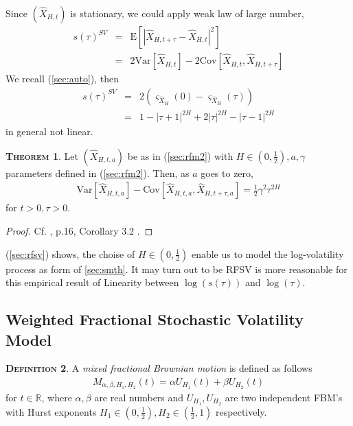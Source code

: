 \documentclass[a4paper, twoside, 11pt]{article}
\theoremstyle{definition}
\newtheorem{definition}{\scshape Definition}[section]
\newtheorem{theorem}[definition]{\scshape Theorem}
\begin{document}
Since $(\hat{X}_{H,t})$ is stationary, we could apply weak law of large number,
\begin{eqnarray}
  s(\tau)^{SV} &=& \mathrm{E}[|\hat{X}_{H,t+\tau}-\hat{X}_{H,t}|^2]\nonumber\\
  &=& 2 \mathrm{Var}[\hat{X}_{H,t}] - 2 \mathrm{Cov}[\hat{X}_{H,t}, \hat{X}_{H,t+\tau}]\nonumber
  \label{sec:smtsv}
\end{eqnarray}
We recall (\ref{sec:auto}), then
\begin{eqnarray}
  s(\tau)^{SV} &=& 2 (\varsigma_{\hat{X}_H}(0) - \varsigma_{\hat{X}_H}(\tau))\nonumber\\
  &=& 1 - |\tau+1|^{2H} + 2|\tau|^{2H} - |\tau-1|^{2H}
  \label{sec:smtsv2}
\end{eqnarray}
in general not linear.

\begin{theorem}
  Let $(\hat{X}_{H, t, a})$ be as in (\ref{sec:rfm2}) with $H\in(0, \frac{1}{2}), a, \gamma$  parameters defined in (\ref{sec:rfm2}). Then, as $a$ goes to zero,
  \begin{eqnarray}
	\mathrm{Var}[\hat{X}_{H,t, a}] - \mathrm{Cov}[\hat{X}_{H,t, a}, \hat{X}_{H,t+\tau, a}] = \frac{1}{2} \gamma^2\tau^{2H}
	\label{sec:rfsv}
  \end{eqnarray}
  for $t>0, \tau>0$.
\end{theorem}
\begin{proof}
  Cf. \cite{gradin}, p.16, Corollary 3.2 .
\end{proof}

(\ref{sec:rfsv}) shows, the choise of $H\in(0,\frac{1}{2})$ enable us to model the log-volatility process as form of \ref{sec:smth}. It may turn out to be RFSV is more reasonable for this empirical result of Linearity between $\log(s(\tau))$ and $\log(\tau)$.

\subsection{Weighted Fractional Stochastic Volatility Model}
\begin{definition}
  A \emph{mixed fractional Brownian motion} is defined as follows
\begin{eqnarray}
  M_{\alpha,\beta,H_1,H_2}(t) = \alpha U_{H_1}(t) + \beta U_{H_2}(t)
  \label{sec:mfsv}
\end{eqnarray}
for $t\in \mathbb{R}$, where $\alpha, \beta$ are real numbers and $U_{H_1}, U_{H_2}$ are two independent FBM's with Hurst exponents $H_1 \in (0, \frac{1}{2}), H_2 \in (\frac{1}{2}, 1)$ respectively.
\end{definition}
\end{document}
